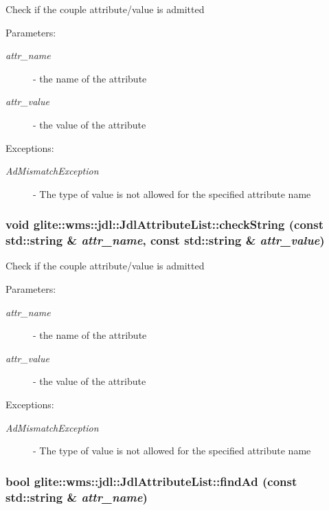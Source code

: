 Check if the couple attribute/value is admitted \begin{Desc}
\item[Parameters:]
\begin{description}
\item[{\em attr\_\-name}]- the name of the attribute \item[{\em attr\_\-value}]- the value of the attribute \end{description}
\end{Desc}
\begin{Desc}
\item[Exceptions:]
\begin{description}
\item[{\em Ad\-Mismatch\-Exception}]- The type of value is not allowed for the specified attribute name \end{description}
\end{Desc}
\hypertarget{classglite_1_1wms_1_1jdl_1_1JdlAttributeList_z25_4}{
\subsubsection[checkString]{\setlength{\rightskip}{0pt plus 5cm}void glite::wms::jdl::Jdl\-Attribute\-List::check\-String (const std::string \& {\em attr\_\-name}, const std::string \& {\em attr\_\-value})}}
\label{classglite_1_1wms_1_1jdl_1_1JdlAttributeList_z25_4}


Check if the couple attribute/value is admitted \begin{Desc}
\item[Parameters:]
\begin{description}
\item[{\em attr\_\-name}]- the name of the attribute \item[{\em attr\_\-value}]- the value of the attribute \end{description}
\end{Desc}
\begin{Desc}
\item[Exceptions:]
\begin{description}
\item[{\em Ad\-Mismatch\-Exception}]- The type of value is not allowed for the specified attribute name \end{description}
\end{Desc}
\hypertarget{classglite_1_1wms_1_1jdl_1_1JdlAttributeList_a6}{
\subsubsection[findAd]{\setlength{\rightskip}{0pt plus 5cm}bool glite::wms::jdl::Jdl\-Attribute\-List::find\-Ad (const std::string \& {\em attr\_\-name})}}
\label{classglite_1_1wms_1_1jdl_1_1JdlAttributeList_a6}


